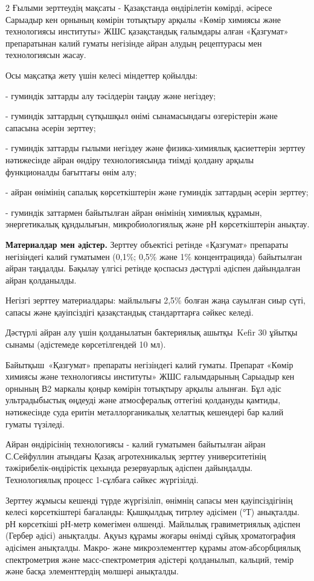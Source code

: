 \begin{multicols}{2}
Ғылыми зерттеудің мақсаты - Қазақстанда өндірілетін көмірді, әсіресе
Сарыадыр кен орнының көмірін тотықтыру арқылы «Көмір химиясы және
технологиясы институты» ЖШС қазақстандық ғалымдары алған «Қазгумат»
препаратынан калий гуматы негізінде айран алудың рецептурасы мен
технологиясын жасау.

Осы мақсатқа жету үшін келесі міндеттер қойылды:

- гуминдік заттарды алу тәсілдерін таңдау және негіздеу;

- гуминдік заттардың сүтқышқыл өнімі сынамасындағы өзгерістерін және
сапасына әсерін зерттеу;

- гуминдік заттарды ғылыми негіздеу және физика-химиялық қасиеттерін
зерттеу нәтижесінде айран өндіру технологиясында тиімді қолдану арқылы
функционалды бағыттағы өнім алу;

- айран өнімінің сапалық көрсеткіштерін және гуминдік заттардың әсерін
зерттеу;

- гуминдік заттармен байытылған айран өнімінің химиялық құрамын,
энергетикалық құндылығын, микробиологиялық және рН көрсеткіштерін
анықтау.

{\bfseries Материалдар мен әдістер.} Зерттеу объектісі ретінде «Қазгумат»
препараты негізіндегі калий гуматымен (0,1\%; 0,5\% және 1\%
концентрацияда) байытылған айран таңдалды. Бақылау үлгісі ретінде
қоспасыз дәстүрлі әдіспен дайындалған айран қолданылды.

Негізгі зерттеу материалдары: майлылығы 2,5\% болған жаңа сауылған сиыр
сүті, сапасы және қауіпсіздігі қазақстандық стандарттарға сәйкес келеді.

Дәстүрлі айран алу үшін қолданылатын бактериялық ашытқы~Kefir 30 ұйытқы
сынамы (әдістемеде көрсетілгендей 10 мл).

Байытқыш~«Қазгумат» препараты негізіндегі калий гуматы. Препарат «Көмір
химиясы және технологиясы институты» ЖШС ғалымдарының Сарыадыр кен
орнының В2 маркалы қоңыр көмірін тотықтыру арқылы алынған. Бұл әдіс
ультрадыбыстық өңдеуді және атмосфералық оттегіні қолдануды қамтиды,
нәтижесінде суда еритін металлорганикалық хелаттық кешендері бар калий
гуматы түзіледі.

Айран өндірісінің технологиясы - калий гуматымен байытылған айран
С.Сейфуллин атындағы Қазақ агротехникалық зерттеу университетінің
тәжірибелік-өндірістік цехында резервуарлық әдіспен дайындалды.
Технологиялық процесс 1-сұлбаға сәйкес жүргізілді.

Зерттеу жұмысы кешенді түрде жүргізіліп, өнімнің сапасы мен
қауіпсіздігінің келесі көрсеткіштері бағаланды: Қышқылдық титрлеу
әдісімен (°Т) анықталды. рН көрсеткіші рН-метр көмегімен өлшенді.
Майлылық гравиметриялық әдіспен (Гербер әдісі) анықталды. Ақуыз құрамы
жоғары өнімді сұйық хроматография әдісімен анықталды. Макро- және
микроэлементтер құрамы атом-абсорбциялық спектрометрия және
масс-спектрометрия әдістері қолданылып, кальций, темір және басқа
элементтердің мөлшері анықталды.


\end{multicols}
